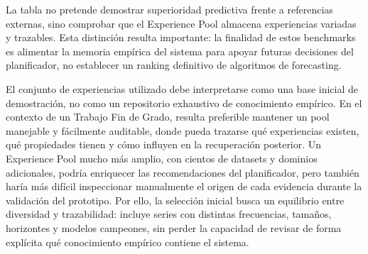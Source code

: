 \documentclass[12pt,a4paper]{article}
\theoremstyle{plain}
\begin{document}
La tabla no pretende demostrar superioridad predictiva frente a referencias externas, sino comprobar que el Experience Pool almacena experiencias variadas y trazables. Esta distinción resulta importante: la finalidad de estos benchmarks es alimentar la memoria empírica del sistema para apoyar futuras decisiones del planificador, no establecer un ranking definitivo de algoritmos de forecasting.

El conjunto de experiencias utilizado debe interpretarse como una base inicial de demostración, no como un repositorio exhaustivo de conocimiento empírico. En el contexto de un Trabajo Fin de Grado, resulta preferible mantener un pool manejable y fácilmente auditable, donde pueda trazarse qué experiencias existen, qué propiedades tienen y cómo influyen en la recuperación posterior. Un Experience Pool mucho más amplio, con cientos de datasets y dominios adicionales, podría enriquecer las recomendaciones del planificador, pero también haría más difícil inspeccionar manualmente el origen de cada evidencia durante la validación del prototipo. Por ello, la selección inicial busca un equilibrio entre diversidad y trazabilidad: incluye series con distintas frecuencias, tamaños, horizontes y modelos campeones, sin perder la capacidad de revisar de forma explícita qué conocimiento empírico contiene el sistema.
\end{document}
